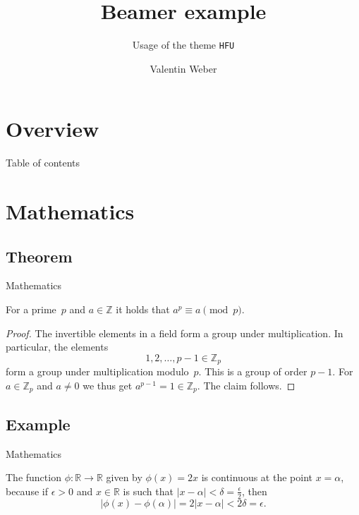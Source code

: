 \documentclass[UKenglish,aspectratio=169,logotop]{beamer}
\author{Valentin Weber}
\title{Beamer example}
\subtitle{Usage of the theme \texttt{HFU}}
\begin{document}
\section{Overview}
%
%
\begin{frame}{Table of contents}
    \tableofcontents
\end{frame}


\section{Mathematics}
\subsection{Theorem}


\begin{frame}{Mathematics}
    \begin{theorem}
        For a prime~\(p\) and \(a \in \mathbb{Z}\) it holds that \(a^p \equiv a \pmod{p}\).
    \end{theorem}

    \begin{proof}
        The invertible elements in a field form a group under multiplication.
        In particular, the elements
        \begin{equation*}
            1, 2, \ldots, p - 1 \in \mathbb{Z}_p
        \end{equation*}
        form a group under multiplication modulo~\(p\).
        This is a group of order \(p - 1\).
        For \(a \in \mathbb{Z}_p\) and \(a \neq 0\) we thus get \(a^{p-1} = 1 \in \mathbb{Z}_p\).
        The claim follows.
    \end{proof}
\end{frame}


\subsection{Example}


\begin{frame}{Mathematics}
    \begin{example}
        The function \(\phi \colon \mathbb{R} \to \mathbb{R}\) given by \(\phi(x) = 2x\) is continuous at the point \(x = \alpha\),
        because if \(\epsilon > 0\) and \(x \in \mathbb{R}\) is such that \(\lvert x - \alpha \rvert < \delta = \frac{\epsilon}{2}\),
        then
        \begin{equation*}
            \lvert \phi(x) - \phi(\alpha)\rvert = 2\lvert x - \alpha \rvert < 2\delta = \epsilon.
        \end{equation*}
    \end{example}
\end{frame}
\end{document}

